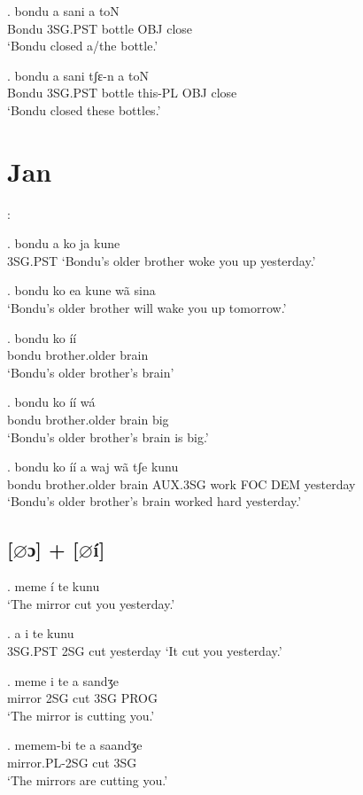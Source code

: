\documentclass{assets/fieldnotes}
\begin{document}
\exg.
bondu   a   sani     a     toN   \\
Bondu   3SG.PST   bottle   OBJ   close \\%
`Bondu closed a/the bottle.'

\exg.
bondu   a   sani     tʃɛ-n     a     toN   \\
Bondu   3SG.PST   bottle   this-PL   OBJ   close \\%
`Bondu closed these bottles.'


\section{Jan}

:

\ex. bondu a ko ja kune \\
           3SG.PST
`Bondu's older brother woke you up yesterday.'

\ex. bondu ko ea kune wã sina \\
`Bondu's older brother will wake you up tomorrow.'

\exg. bondu ko íí \\
bondu brother.older brain \\
`Bondu's older brother's brain'

\exg. bondu ko íí wá \\
bondu brother.older brain big \\
`Bondu's older brother's brain is big.'

\exg. bondu ko íí a waj wã tʃe kunu \\
bondu brother.older brain AUX.3SG work FOC DEM yesterday \\
`Bondu's older brother's brain worked hard yesterday.'

\subsection{[$\varnothing$ɔ] + [$\varnothing$í]}

\ex. meme í te kunu \\
`The mirror cut you yesterday.'

\ex. a i te kunu \\
3SG.PST 2SG cut  yesterday
`It cut you yesterday.'

\exg. meme i te a sandʒe \\
mirror 2SG cut 3SG PROG \\
`The mirror is cutting you.'

\exg. memem-bi te a saandʒe \\
mirror.PL-2SG cut 3SG  \\
`The mirrors are cutting you.'
\end{document}

